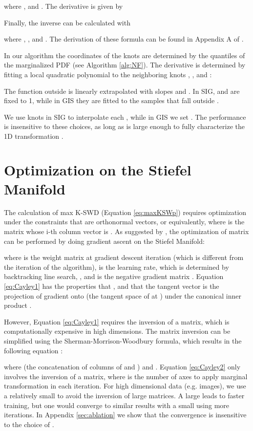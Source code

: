 \documentclass{article}
\begin{document}
where ,  and . The derivative is given by

Finally, the inverse can be calculated with

where , ,  and . The derivation of these formula can be found in Appendix A of \citet{durkan2019neural}.

In our algorithm the coordinates of the knots are determined by the quantiles of the marginalized PDF (see Algorithm \ref{alg:NF}). The derivative   is determined by fitting a local quadratic polynomial to the neighboring knots , , and :

The function outside  is linearly extrapolated with slopes  and . In SIG,  and  are fixed to 1, while in GIS they are fitted to the samples that fall outside .

We use  knots in SIG to interpolate each , while in GIS we set . The performance is insensitive to these choices, as long as  is large enough to fully characterize the 1D transformation .

\section{Optimization on the Stiefel Manifold}
\label{sec:stiefel}

The calculation of max K-SWD (Equation \ref{eq:maxKSWp}) requires optimization under the constraints that  are orthonormal vectors, or equivalently,  where  is the matrix whose i-th column vector is . As suggested by \citet{tagare2011notes}, the optimization of matrix  can be performed by doing gradient ascent on the Stiefel Manifold:

where  is the weight matrix at gradient descent iteration  (which is different from the iteration  of the algorithm),  is the learning rate, which is determined by backtracking line search, , and  is the negative gradient matrix . Equation \ref{eq:Cayley1} has the properties that , and that the tangent vector  is the projection of gradient  onto  (the tangent space of  at ) under the canonical inner product \citep{tagare2011notes}. 

However, Equation \ref{eq:Cayley1} requires the inversion of a  matrix, which is computationally expensive in high dimensions. The matrix inversion can be simplified using the Sherman-Morrison-Woodbury formula, which results in the following equation \citep{tagare2011notes}:

where  (the concatenation of columns of  and ) and . Equation \ref{eq:Cayley2} only involves the inversion of a  matrix, where  is the number of axes to apply marginal transformation in each iteration. For high dimensional data (e.g. images), we use a relatively small  to avoid the inversion of large matrices. A large  leads to faster training, but one would converge to similar results with a small  using more iterations. In Appendix \ref{sec:ablation} we show that the convergence is insensitive to the choice of .
\end{document}
